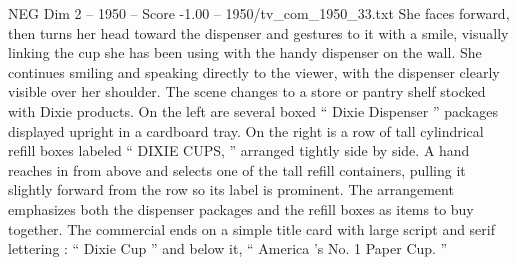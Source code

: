 \begin{textsample}{NEG Dim 2 – 1950 – Score -1.00 – 1950/tv\_com\_1950\_33.txt}
She faces forward, then turns her head toward the dispenser and gestures to it with a smile, visually linking the cup she has been using with the handy dispenser on the wall.
She continues smiling and speaking directly to the viewer, with the dispenser clearly visible over her shoulder.
The scene changes to a store or pantry shelf stocked with Dixie products.
On the left are several boxed “ Dixie Dispenser ” packages displayed upright in a cardboard tray.
On the right is a row of tall cylindrical refill boxes labeled “ DIXIE CUPS, ” arranged tightly side by side.
A hand reaches in from above and selects one of the tall refill containers, pulling it slightly forward from the row so its label is prominent.
The arrangement emphasizes both the dispenser packages and the refill boxes as items to buy together.
The commercial ends on a simple title card with large script and serif lettering : “ Dixie Cup ” and below it, “ America ’s No. 1 Paper Cup. ”

\end{textsample}
